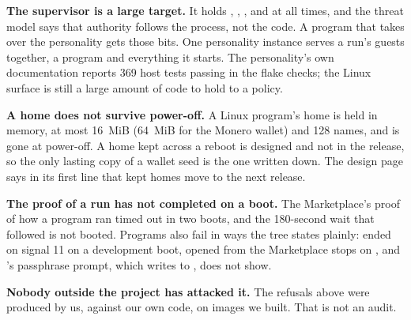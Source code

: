 \textbf{The supervisor is a large target.} It holds , , ,  and  at all times, and the threat model says that authority follows the process, not the code. A program that takes over the personality gets those bits. One personality instance serves a run's guests together, a program and everything it starts. The personality's own documentation reports 369 host tests passing in the flake checks; the Linux surface is still a large amount of code to hold to a policy.

\textbf{A home does not survive power-off.} A Linux program's home is held in memory, at most 16~MiB (64~MiB for the Monero wallet) and 128 names, and is gone at power-off. A home kept across a reboot is designed and not in the release, so the only lasting copy of a wallet seed is the one written down. The design page says in its first line that kept homes move to the next release.

\textbf{The proof of a run has not completed on a boot.} The Marketplace's proof of how a program ran timed out in two boots, and the 180-second wait that followed is not booted. Programs also fail in ways the tree states plainly:  ended on signal 11 on a development boot,  opened from the Marketplace stops on , and 's passphrase prompt, which writes to , does not show.

\textbf{Nobody outside the project has attacked it.} The refusals above were produced by us, against our own code, on images we built. That is not an audit.
